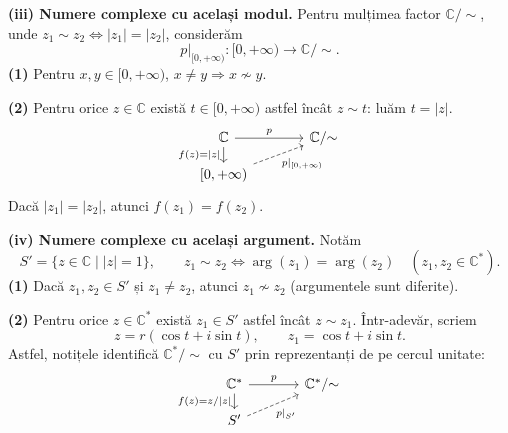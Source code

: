 \medskip
\noindent\textbf{(iii) Numere complexe cu același modul.}
Pentru mulțimea factor $\mathbb C/{\sim}$, unde
$z_1\sim z_2\iff|z_1|=|z_2|$, considerăm
\[
 p|_{[0,+\infty)}:[0,+\infty)\longrightarrow\mathbb C/{\sim}.
\]
\noindent\textbf{(1)} Pentru $x,y\in[0,+\infty)$,
$x\ne y\Longrightarrow x\not\sim y$.

\noindent\textbf{(2)} Pentru orice $z\in\mathbb C$ există
$t\in[0,+\infty)$ astfel încât $z\sim t$: luăm $t=|z|$.
\[
\begin{tikzcd}[column sep=large,row sep=small]
 \mathbb C\arrow[r,"p"]\arrow[d,"{f(z)=|z|}"']
    & \mathbb C/{\sim} \\
 {[0,+\infty)}\arrow[ur,dashed,"{p|_{[0,+\infty)}}"'] &
\end{tikzcd}
\]
Dacă $|z_1|=|z_2|$, atunci $f(z_1)=f(z_2)$.

\medskip
\noindent\textbf{(iv) Numere complexe cu același argument.}
Notăm
\[
 S'=\{z\in\mathbb C\mid |z|=1\},\qquad
 z_1\sim z_2\iff\arg(z_1)=\arg(z_2)
 \quad(z_1,z_2\in\mathbb C^*).
\]
\noindent\textbf{(1)} Dacă $z_1,z_2\in S'$ și $z_1\ne z_2$,
atunci $z_1\not\sim z_2$ (argumentele sunt diferite).

\noindent\textbf{(2)} Pentru orice $z\in\mathbb C^*$ există
$z_1\in S'$ astfel încât $z\sim z_1$. Într-adevăr, scriem
\[
 z=r(\cos t+i\sin t),\qquad z_1=\cos t+i\sin t.
\]
Astfel, notițele identifică $\mathbb C^*/{\sim}$ cu $S'$ prin
reprezentanți de pe cercul unitate:
\[
\begin{tikzcd}[column sep=large,row sep=small]
 \mathbb C^*\arrow[r,"p"]\arrow[d,"{f(z)=z/|z|}"']
    & \mathbb C^*/{\sim} \\
 S'\arrow[ur,dashed,"{p|_{S'}}"'] &
\end{tikzcd}
\]

\endgroup
